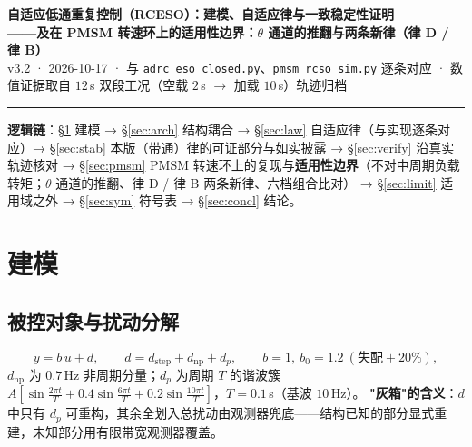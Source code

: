 \documentclass[11pt]{article}
\theoremstyle{remark}\newtheorem{remark}{注}
\begin{document}
\begin{center}
{\Large\bfseries 自适应低通重复控制（RCESO）：建模、自适应律与一致稳定性证明}\\[3pt]
{\small\bfseries ——及在 PMSM 转速环上的适用性边界：$\theta$ 通道的推翻与两条新律（律 D / 律 B）}\\[4pt]
{\small v3.2 · 2026-10-17 · 与 \texttt{adrc\_eso\_closed.py}、\texttt{pmsm\_rcso\_sim.py} 逐条对应 · 数值证据取自 $12$\,s 双段工况（空载 $2$\,s $\to$ 加载 $10$\,s）轨迹归档}
\end{center}
\vspace{-1mm}\noindent\rule{\textwidth}{0.4pt}\vspace{-1mm}
\noindent\textbf{逻辑链}：\S\ref{sec:model} 建模 → \S\ref{sec:arch} 结构耦合 → \S\ref{sec:law} 自适应律（与实现逐条对应）→ \S\ref{sec:stab} 本版（带通）律的可证部分与如实披露 → \S\ref{sec:verify} 沿真实轨迹核对 → \S\ref{sec:pmsm} PMSM 转速环上的复现与\textbf{适用性边界}（不对中周期负载转矩；$\theta$ 通道的推翻、律 D / 律 B 两条新律、六档组合比对） → \S\ref{sec:limit} 适用域之外 → \S\ref{sec:sym} 符号表 → \S\ref{sec:concl} 结论。
\vspace{1mm}

\noindent{}
\section{建模}\label{sec:model}
\subsection{被控对象与扰动分解}
\begin{equation}
  \dot y = b\,u+d,\qquad d = d_{\mathrm{step}}+d_{\mathrm{np}}+d_p,\qquad b=1,\ b_0=1.2\ (\text{失配}+20\%),
\end{equation}
$d_{\mathrm{np}}$ 为 $0.7\,$Hz 非周期分量；$d_p$ 为周期 $T$ 的谐波簇
$A[\sin\frac{2\pi t}{T}+0.4\sin\frac{6\pi t}{T}+0.2\sin\frac{10\pi t}{T}]$，$T=0.1\,$s（基波 $10\,$Hz）。
\textbf{"灰箱"的含义}：$d$ 中只有 $d_p$ 可重构，其余全划入总扰动由观测器兜底——结构已知的部分显式重建，未知部分用有限带宽观测器覆盖。
\end{document}
